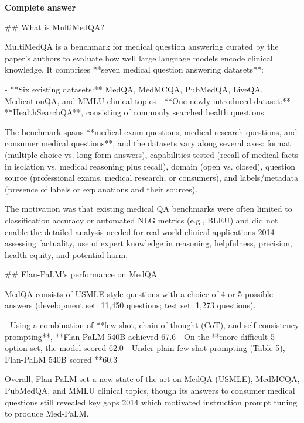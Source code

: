 \documentclass[10pt]{article}
\begin{document}
\textbf{Complete answer}
\begin{AnswerText}
## What is MultiMedQA?

MultiMedQA is a benchmark for medical question answering curated by the paper's authors to evaluate how well large language models encode clinical knowledge. It comprises **seven medical question answering datasets**:

- **Six existing datasets:** MedQA, MedMCQA, PubMedQA, LiveQA, MedicationQA, and MMLU clinical topics
- **One newly introduced dataset:** **HealthSearchQA**, consisting of commonly searched health questions

The benchmark spans **medical exam questions, medical research questions, and consumer medical questions**, and the datasets vary along several axes: format (multiple-choice vs. long-form answers), capabilities tested (recall of medical facts in isolation vs. medical reasoning plus recall), domain (open vs. closed), question source (professional exams, medical research, or consumers), and labels/metadata (presence of labels or explanations and their sources).

The motivation was that existing medical QA benchmarks were often limited to classification accuracy or automated NLG metrics (e.g., BLEU) and did not enable the detailed analysis needed for real-world clinical applications \u2014 assessing factuality, use of expert knowledge in reasoning, helpfulness, precision, health equity, and potential harm.

## Flan-PaLM's performance on MedQA

MedQA consists of USMLE-style questions with a choice of 4 or 5 possible answers (development set: 11,450 questions; test set: 1,273 questions).

- Using a combination of **few-shot, chain-of-thought (CoT), and self-consistency prompting**, **Flan-PaLM 540B achieved 67.6%
- On the **more difficult 5-option set, the model scored 62.0%
- Under plain few-shot prompting (Table 5), Flan-PaLM 540B scored **60.3%

Overall, Flan-PaLM set a new state of the art on MedQA (USMLE), MedMCQA, PubMedQA, and MMLU clinical topics, though its answers to consumer medical questions still revealed key gaps \u2014 which motivated instruction prompt tuning to produce Med-PaLM.
\end{AnswerText}
\end{document}
